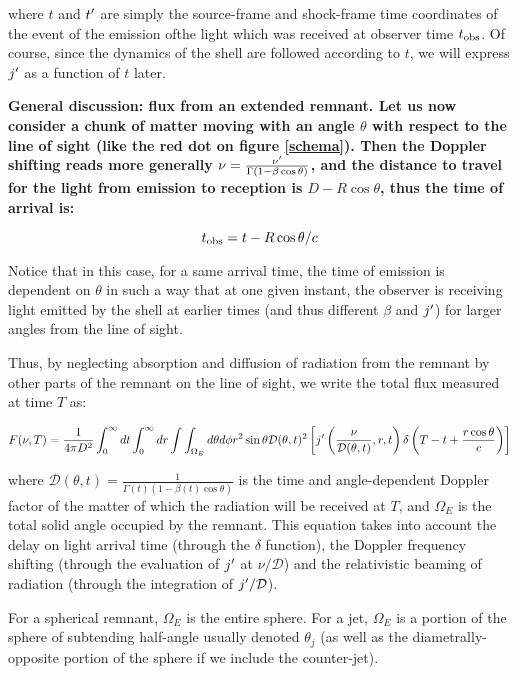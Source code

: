 where $t$ and $t^{\prime}$ are simply the source-frame and shock-frame time coordinates of the event of the emission ofthe light which was received at observer time ${t_{\mathrm{obs}}}$. Of course, since the dynamics of the shell are followed according to $t$, we will express $j^{\prime}$ as a function of $t$ later.

\bf{General discussion: flux from an extended remnant.} Let us now consider a chunk of matter moving with an angle $\theta$ with respect to the line of sight (like the red dot on figure \ref{schema}). Then the Doppler shifting reads more generally $\nu = \frac{\nu^{\prime}}{\Gamma (1 - \beta \cos \theta)}$, and the distance to travel for the light from emission to reception is $D - R \cos \theta$, thus the time of arrival is:

\begin{equation}
\tobs = t - R \cos \theta / c

\end{equation}


Notice that in this case, for a same arrival time, the time of emission is dependent on $\theta$ in such a way that at one given instant, the observer is receiving light emitted by the shell at earlier times (and thus different $\beta$ and $j^{\prime}$) for larger angles from the line of sight.

Thus, by neglecting absorption and diffusion of radiation from the remnant by other parts of the remnant on the line of sight, we write the total flux measured at time $T$ as:


\begin{equation}\label{in}
    F(\nu, T) = \frac{1}{4\pi D ^ 2}\int_0^{\infty} dt \int_0^\infty dr \int \int_{\Omega_E} d\theta d\phi r^2 \sin \theta \mathcal{D}(\theta, t)^2 \left[ j^{\prime}\left(\frac{\nu}{\mathcal{D}(\theta, t)}, r, t\right) \delta\left(T - t + \frac{r\cos\theta}{c}\right) \right]
\end{equation}


where $\mathcal{D}(\theta, t) = \frac{1}{\Gamma(t)(1 - \beta(t) \cos \theta)}$ is the time and angle-dependent Doppler factor of the matter of which the radiation will be received at $T$, and $\Omega_E$ is the total solid angle occupied by the remnant. This equation takes into account the delay on light arrival time (through the $\delta$ function), the Doppler frequency shifting (through the evaluation of $j^{\prime}$ at $\nu/\mathcal{D}$) and the relativistic beaming of radiation (through the integration of $j^{\prime}/\mathcal{D}$).

For a spherical remnant, $\Omega_E$ is the entire sphere. For a jet, $\Omega_E$ is a portion of the sphere of subtending half-angle usually denoted $\theta_j$ (as well as the diametrally-opposite portion of the sphere if we include the counter-jet).

